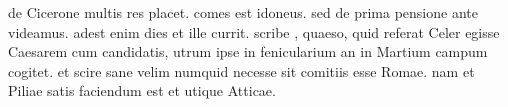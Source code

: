 


 de Cicerone multis res placet. comes est idoneus. sed de prima pensione ante videamus. adest enim dies et ille currit. scribe , quaeso, quid referat Celer egisse Caesarem cum candidatis, utrum ipse in fenicularium an in Martium campum cogitet. et scire sane velim numquid necesse sit comitiis esse Romae. nam et Piliae satis faciendum est et utique Atticae.
